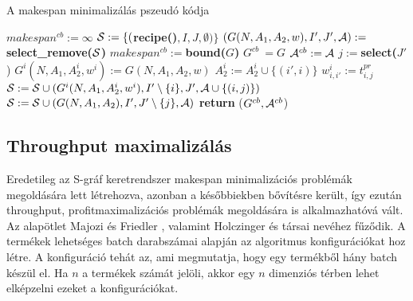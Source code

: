 \begin{algorithm}[H]
\caption{A makespan minimalizálás pszeudó kódja}
\label{makespan_min}
\begin{algorithmic}[1]
  \State $makespan^{cb}:= \infty$
  \State ${\cal S}:= \{($\textbf{recipe()}$,I,J,\emptyset)\}$  
    \State $(G(N,A_1,A_2,w),I',J',{\cal A}):= $\textbf{select\_remove(}$\cal S$\textbf{)}
        \State $makespan^{cb}:= $\textbf{bound(}$G$\textbf{)}
        \State $G^{cb}\:= G$
        \State ${\cal A}^{cb}:= {\cal A}$        
      \Else
        \State $j:= $\textbf{select(}$J'${)} 
          \State $G^i(N,A_1,A^i_2,w^i):= G(N,A_1,A_2,w)$
            \State $A^i_2:= A^i_2 \cup \{(i',i)\}$
          \EndFor        
            \State $w^i_{i,i'}:= t^{pr}_{i,j}$
          \EndFor
          \State ${\cal S}:= {\cal S} \cup (G^i(N,A_1,A^i_2,w^i),I'\setminus\{i\},J',{\cal A}\cup\{(i,j)\})$
        \EndFor
          \State ${\cal S}:= {\cal S} \cup (G(N,A_1,A_2),I',J'\setminus\{j\},{\cal A})$
        \EndIf
      \EndIf %
    \EndIf %
  \EndWhile %
    \State \textbf{return} ($G^{cb},{\cal A}^{cb}$)
  \EndIf
\end{algorithmic}
\end{algorithm}

\newpage
\subsection{Throughput maximalizálás}
Eredetileg az S-gráf keretrendszer makespan minimalizációs problémák megoldására lett létrehozva, azonban a későbbiekben bővítésre került, így ezután throughput, profitmaximalizációs problémák megoldására is alkalmazhatóvá vált. Az alapötlet Majozi és Friedler \cite{majozifriedler}, valamint Holczinger és társai \cite{holczinger} nevéhez fűződik. A termékek lehetséges batch darabszámai alapján az algoritmus konfigurációkat hoz létre. A konfiguráció tehát az, ami megmutatja, hogy egy termékből hány batch készül el. Ha $n$ a termékek számát jelöli, akkor egy $n$ dimenziós térben lehet elképzelni ezeket a konfigurációkat. 

